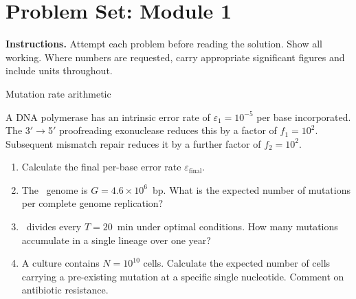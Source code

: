 \documentclass[12pt, a4paper, oneside]{report}
\begin{document}
\newpage
\section{Problem Set: Module 1}

\noindent\textbf{Instructions.} Attempt each problem before reading the
solution. Show all working. Where numbers are requested, carry appropriate
significant figures and include units throughout.

\begin{problem}{\enspace{}\enspace{}\enspace Mutation rate arithmetic}

  A DNA polymerase has an intrinsic error rate of
  $\varepsilon_1 = 10^{-5}$ per base incorporated.
  The 3$'\to$5$'$ proofreading exonuclease reduces this by a factor of
  $f_1 = 10^2$. Subsequent mismatch repair reduces it by a further factor
  of $f_2 = 10^2$.

  \begin{enumerate}
    \item Calculate the final per-base error rate $\varepsilon_\text{final}$.
    \item The \Ecoli\ genome is $G = 4.6 \times 10^6$~bp. What is the
          expected number of mutations per complete genome replication?
    \item \Ecoli\ divides every $T = 20$~min under optimal conditions.
          How many mutations accumulate in a single lineage over one year?
    \item A culture contains $N = 10^{10}$ cells. Calculate the expected
          number of cells carrying a pre-existing mutation at a specific
          single nucleotide. Comment on antibiotic resistance.
  \end{enumerate}
\end{problem}
\end{document}
